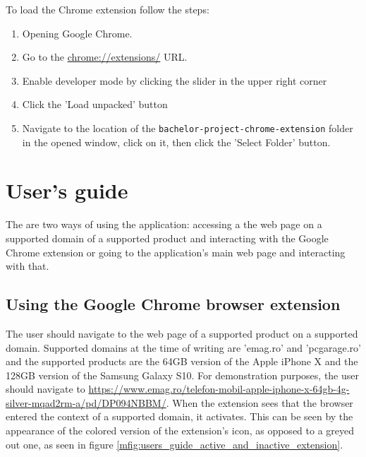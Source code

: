 \documentclass[12pt,a4paper,twoside]{report}
\begin{document}
To load the Chrome extension follow the steps:
\begin{enumerate}
  \item Opening Google Chrome.
  \item Go to the \url{chrome://extensions/} URL.
  \item Enable developer mode by clicking the slider in the upper right corner
  \item Click the 'Load unpacked' button
  \item Navigate to the location of the \lstinline$bachelor-project-chrome-extension$ folder in the opened window, click on it, then click the 'Select Folder' button.
\end{enumerate}

\section{User's guide}

The are two ways of using the application: accessing a the web page on a supported domain of a supported product and interacting with the Google Chrome extension or going to the application's main web page and interacting with that.

\subsection{Using the Google Chrome browser extension}

The user should navigate to the web page of a supported product on a supported domain. Supported domains at the time of writing are 'emag.ro' and 'pcgarage.ro' and the supported products are the 64GB version of the Apple iPhone X and the 128GB version of the Samsung Galaxy S10. For demonstration purposes, the user should navigate to \url{https://www.emag.ro/telefon-mobil-apple-iphone-x-64gb-4g-silver-mqad2rm-a/pd/DP094NBBM/}. When the extension sees that the browser entered the context of a supported domain, it activates. This can be seen by the appearance of the colored version of the extension's icon, as opposed to a greyed out one, as seen in figure \ref{mfig:users_guide_active_and_inactive_extension}.
\end{document}
